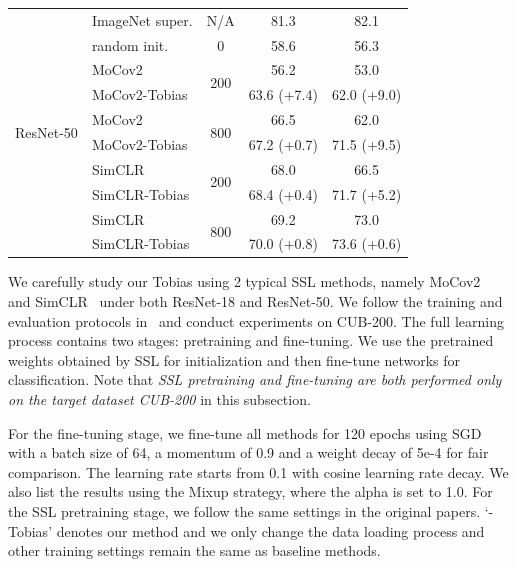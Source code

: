 \documentclass[letterpaper]{article}
\def\pt{\phantom{0}}
\begin{document}
\begin{table}
\begin{tabular}{l|l|c|c|c}
		\multirow{10}{*}{ResNet-50}& ImageNet super.&N/A &    81.3 \pt\pt\pt\pt\pt&82.1 \pt\pt\pt\pt\pt\\
		\cline{2-5}
		& random init. &0& 58.6 \pt\pt\pt\pt\pt&56.3 \pt\pt\pt\pt\pt\\
		\cline{2-5}
		& MoCov2 & \multirow{2}{*}{200}     &56.2 \pt\pt\pt\pt\pt &53.0 \pt\pt\pt\pt\pt \\
		&MoCov2-Tobias&&63.6 (\textcolor{grassgreen}{+7.4})&62.0 (\textcolor{grassgreen}{+9.0})\\
		\cline{2-5}
		& MoCov2 & \multirow{2}{*}{800}   & 66.5 \pt\pt\pt\pt\pt&62.0 \pt\pt\pt\pt\pt\\
		&MoCov2-Tobias&&67.2 (\textcolor{grassgreen}{+0.7})&71.5 (\textcolor{grassgreen}{+9.5})\\
		\cline{2-5}
		& SimCLR & \multirow{2}{*}{200}     &68.0 \pt\pt\pt\pt\pt&66.5 \pt\pt\pt\pt\pt\\
		&SimCLR-Tobias&&68.4 (\textcolor{grassgreen}{+0.4})&71.7 (\textcolor{grassgreen}{+5.2}) \\
		\cline{2-5}
		& SimCLR & \multirow{2}{*}{800}   & 69.2 \pt\pt\pt\pt\pt &73.0 \pt\pt\pt\pt\pt\\
		&SimCLR-Tobias&&70.0 (\textcolor{grassgreen}{+0.8})& 73.6 (\textcolor{grassgreen}{+0.6})\\
		\hline
	\end{tabular}
\end{table}

We carefully study our Tobias using 2 typical SSL methods, namely MoCov2~\citep{mocov2:xinlei:arxiv2020} and SimCLR~\citep{simclr:hinton:ICML20} under both ResNet-18 and ResNet-50. We follow the training and evaluation protocols in~\citep{S3L:cao:arxiv2021} and conduct experiments on CUB-200. The full learning process contains two stages: pretraining and fine-tuning. We use the pretrained weights obtained by SSL for initialization and then fine-tune networks for classification. Note that \textit{SSL pretraining and fine-tuning are both performed only on the target dataset CUB-200} in this subsection.

For the fine-tuning stage, we fine-tune all methods for 120 epochs using SGD with a batch size of 64, a momentum of 0.9 and a weight decay of 5e-4 for fair comparison. The learning rate starts from 0.1 with cosine learning rate decay. We also list the results using the Mixup strategy, where the alpha is set to 1.0. For the SSL pretraining stage, we follow the same settings in the original papers. `-Tobias' denotes our method and we only change the data loading process and other training settings remain the same as baseline methods.
\end{document}
